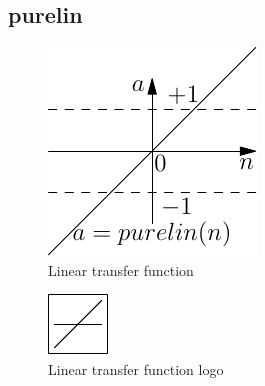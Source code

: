 \subsection{purelin}

\begin{figure}[htb]
\centering
  \includegraphics{octave/neuroToolbox/graphics/purelin}
\caption{Linear transfer function}
\label{fig:purelinTransferFunction}
\end{figure}

\begin{figure}[htb]
\centering
  \includegraphics{octave/neuroToolbox/graphics/purelinlogo}
\caption{Linear transfer function logo}
\label{fig:purelinTransferFunctionLogo}
\end{figure}

